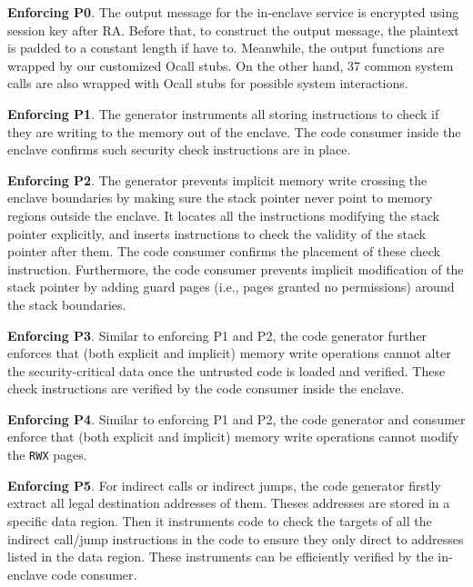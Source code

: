 {%
\vspace{3pt}\noindent\textbf{Enforcing P0}. The output message for the in-enclave service is encrypted using session key after RA. Before that, to construct the output message, the plaintext is padded to a constant length if have to. Meanwhile, the output functions are wrapped by our customized Ocall stubs. On the other hand, 37 common system calls are also wrapped with Ocall stubs for possible system interactions.

\vspace{3pt}\noindent\textbf{Enforcing P1}. The generator instruments all storing instructions to check if they are writing to the memory out of the enclave. The code consumer inside the enclave confirms such security check instructions are in place.

\vspace{3pt}\noindent\textbf{Enforcing P2}. The generator prevents implicit memory write crossing the enclave boundaries by making sure the stack pointer never point to memory regions outside the enclave. It locates all the instructions modifying the stack pointer explicitly, and inserts instructions to check the validity of the stack pointer after them. The code consumer confirms the placement of these check instruction. Furthermore, the code consumer prevents implicit modification of the stack pointer by adding guard pages (i.e., pages granted no permissions) around the stack boundaries. 

\vspace{3pt}\noindent\textbf{Enforcing P3}. Similar to enforcing P1 and P2, the code generator further enforces that (both explicit and implicit) memory write operations cannot alter the security-critical data once the untrusted code is loaded and verified. These check instructions are verified by the code consumer inside the enclave. 

\vspace{3pt}\noindent\textbf{Enforcing P4}. Similar to enforcing P1 and P2, the code generator and consumer enforce that (both explicit and implicit) memory write operations cannot modify the \texttt{RWX} pages.

\vspace{3pt}\noindent\textbf{Enforcing P5}. For indirect calls or indirect jumps, the code generator firstly extract all legal destination addresses of them. Theses addresses are stored in a specific data region. Then it instruments code to check the targets of all the indirect call/jump instructions in the code to ensure they only direct to addresses listed in the data region. These instruments can be efficiently verified by the in-enclave code consumer.

}
